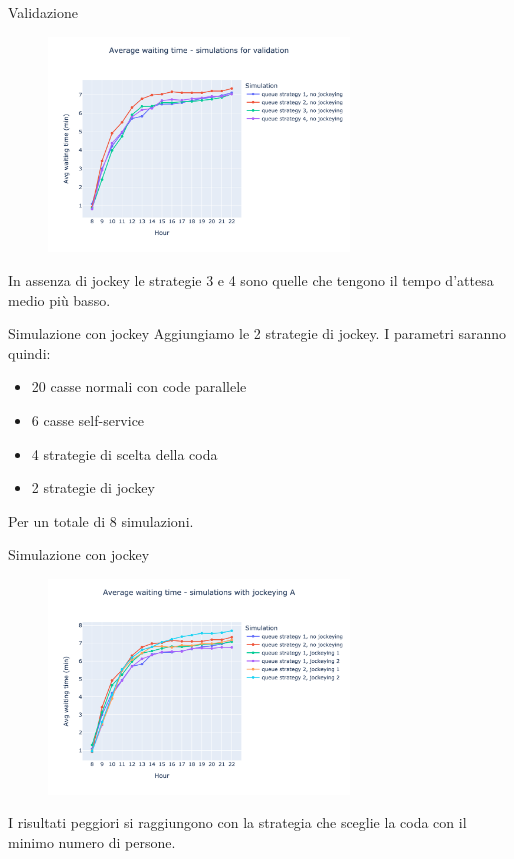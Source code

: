 \begin{frame}{Validazione}
	\begin{figure}[H]
		\centering
		\includegraphics[width=8cm]{"../report/images/results/avg_wt_validation.png"}
	\end{figure}
	In assenza di jockey le strategie 3 e 4 sono quelle che tengono il tempo d'attesa medio più basso.
\end{frame}

\begin{frame}{Simulazione con jockey}
	Aggiungiamo le 2 strategie di jockey. I parametri saranno quindi:
	\begin{itemize}
		\item 20 casse normali con code parallele
		\item 6 casse self-service
		\item 4 strategie di scelta della coda
		\item 2 strategie di jockey
	\end{itemize}
	Per un totale di 8 simulazioni.
\end{frame}

\begin{frame}{Simulazione con jockey}
	\begin{figure}[H]
		\centering
		\includegraphics[width=8cm]{"../report/images/results/avg_wt_jockey_a.png"}
	\end{figure}
	I risultati peggiori si raggiungono con la strategia che sceglie la coda con il minimo numero di persone.
\end{frame}

